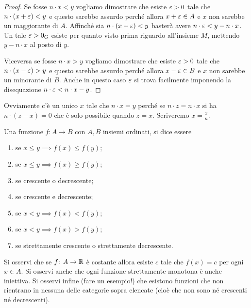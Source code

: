\begin{proof}
Se fosse $n\cdot x<y$ vogliamo dimostrare che esiste $\varepsilon>0$ 
tale che $n\cdot(x+\varepsilon)<y$ e questo sarebbe assurdo perché
allora $x+\varepsilon\in A$ e $x$ non sarebbe un maggiorante di $A$.
Affinché sia $n\cdot(x+\varepsilon)<y$ basterà avere $n\cdot \varepsilon < y-n\cdot x$.
Un tale $\varepsilon>0_G$ esiste per quanto visto prima riguardo all'insieme 
$M$, mettendo $y-n\cdot x$ al posto di $y$.

Viceversa se fosse $n\cdot x>y$ vogliamo dimostrare che esiste $\varepsilon>0$
tale che $n\cdot(x-\varepsilon)>y$ e questo sarebbe assurdo perché
allora $x-\varepsilon\in B$ e $x$ non sarebbe un minorante di $B$.
Anche in questo caso $\varepsilon$ si trova facilmente imponendo 
la disequazione $n\cdot \varepsilon < n\cdot x-y$.
\end{proof}

Ovviamente c'è un unico $x$ tale che $n\cdot x=y$ perché 
se $n\cdot z = n\cdot x$ si ha $n\cdot (z-x) = 0$ che è 
solo possibile quando $z=x$. Scriveremo $x=\frac{x}{n}$.

\begin{definition}
  \label{def:monotonia}%
  \mymark{***}%
  Una funzione $f\colon A \to B$ con $A,B$ insiemi ordinati, si
  dice essere
  \begin{enumerate}
  \item {} se $x \le y \implies f(x) \le f(y)$;
  \item {} se $x \le y \implies f(x) \ge f(y)$;
  \item {} se crescente o decrescente;
  \item {} se crescente e decrescente;
  \item {} se $x<y \implies f(x) < f(y)$;
  \item {} se $x<y \implies f(x) > f(y)$;
  \item {} se strettamente crescente o strettamente decrescente.
  \end{enumerate}
  \end{definition}
  
  Si osservi che se $f\colon A \to {\mathbb R}$ è costante allora esiste $c$ tale che
  $f(x)=c$ per ogni $x\in A$. 
  Si osservi anche che ogni funzione strettamente monotona è anche iniettiva. Si osservi infine (fare un esempio!) che esistono funzioni che non rientrano in nessuna delle categorie sopra elencate (cioè che non sono né crescenti né decrescenti).
  
